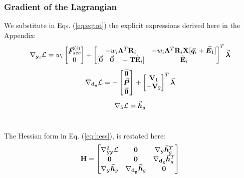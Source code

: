 \begin{appendices}
\subsection{Gradient of the Lagrangian}

We substitute in Eqs. (\ref{eq:eqtot}) the explicit expressions derived here
in the Appendix:
\begin{gather}
	\nabla_{\mathbf{y}_i}\mathcal{L} = w_i\begin{bmatrix}
		\bvec{F}_{sec}^{(i)} \\ 0
	\end{bmatrix} + \begin{bmatrix}
		-w_i\bmat{\Lambda}^T\bmat{R}_i & -w_i\bmat{\Lambda}^T
		\bmat{R}_i\bmat{X}[\bvec{q}_i+\bvec{E}_1]\\
		[\bvec{0}\quad \bvec{0}\quad -\bmat{T}\hat{\mathbf{E}}_i] & 
		\hat{\mathbf{E}}_i
	\end{bmatrix}^T\bvec{\lambda}
	\label{eq:A7}
\end{gather}
\begin{gather}
	\nabla_{\mathbf{d}_g}\mathcal{L} = -\begin{bmatrix}
		\vec{\boldsymbol{0}}\\ \vec{\boldsymbol{P}}\\ \vec{\boldsymbol{0}}	\end{bmatrix} + \begin{bmatrix}
		\mathbf{V}_1 \\ -\mathbf{V}_2
	\end{bmatrix}^T\vec{\boldsymbol{\lambda}}
\end{gather}
\begin{gather}
	\nabla_{\mathbf{\lambda}}\mathcal{L} = \vec{\boldsymbol{h}}_g
\end{gather}

\chapter{}\label{appendix:B}
The Hessian form in Eq. (\ref{eq:hess}), is restated here:
\begin{gather}
	\mathbf{H} = 	\begin{bmatrix}
		\nabla^2_{\mathbf{yy}}\mathcal{L} & \mathbf{0} & 
		\nabla_{\mathbf{y}}\vec{\boldsymbol{h}}^T_g\\
		\mathbf{0} & \mathbf{0} & \nabla_{\mathbf{d_g}}\vec{\boldsymbol{h}}^T_g\\
		\nabla_{\mathbf{y}}\vec{\boldsymbol{h}}_g & \nabla_{\mathbf{d_g}}\vec{\boldsymbol{h}}_g & 
		\mathbf{0}\\
	\end{bmatrix}\nonumber
\end{gather}


\end{appendices}
